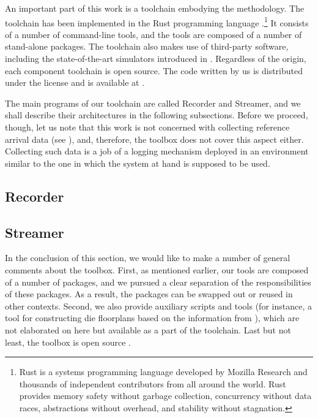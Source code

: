 An important part of this work is a toolchain embodying the methodology. The
toolchain has been implemented in the Rust programming language
\cite{rust}.\footnote{Rust is a systems programming language developed by
Mozilla Research and thousands of independent contributors from all around the
world. Rust provides memory safety without garbage collection, concurrency
without data races, abstractions without overhead, and stability without
stagnation.} It consists of a number of command-line tools, and the tools are
composed of a number of stand-alone packages. The toolchain also makes use of
third-party software, including the state-of-the-art simulators introduced in
. Regardless of the origin, each component toolchain is open
source. The code written by us is distributed under the  license
\cite{mit} and is available at \cite{sources}.

The main programs of our toolchain are called Recorder and Streamer, and we
shall describe their architectures in the following subsections. Before we
proceed, though, let us note that this work is not concerned with collecting
reference arrival data (see ), and, therefore, the toolbox does
not cover this aspect either. Collecting such data is a job of a logging
mechanism deployed in an environment similar to the one in which the system at
hand is supposed to be used.

\subsection{Recorder} 


\subsection{Streamer} 


In the conclusion of this section, we would like to make a number of general
comments about the toolbox. First, as mentioned earlier, our tools are composed
of a number of packages, and we pursued a clear separation of the
responsibilities of these packages. As a result, the packages can be swapped out
or reused in other contexts. Second, we also provide auxiliary scripts and tools
(for instance, a tool for constructing die floorplans based on the information
from ), which are not elaborated on here but available as a part of
the toolchain. Last but not least, the toolbox is open source \cite{sources}.
